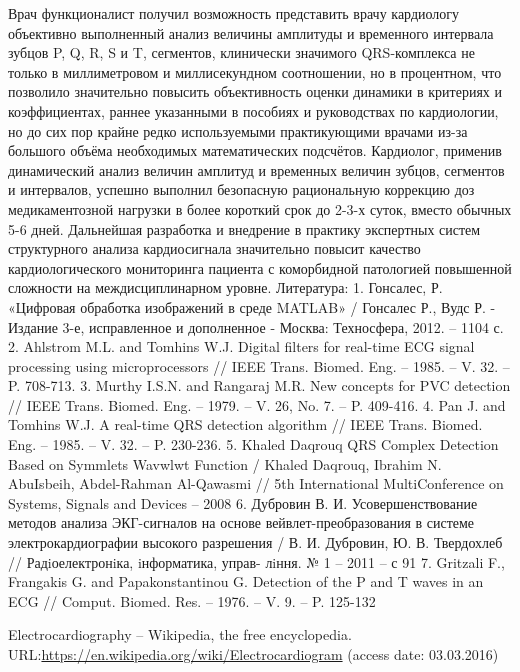 \documentclass[runningheads]{AIIT}
\begin{document}
Врач функционалист получил возможность представить врачу кардиологу объективно выполненный анализ величины амплитуды и временного интервала  зубцов P, Q, R, S и T, сегментов, клинически значимого QRS-комплекса не только в миллиметровом и миллисекундном соотношении, но в процентном, что позволило значительно повысить объективность оценки динамики в критериях и коэффициентах, раннее указанными в  пособиях и руководствах по кардиологии, но до сих пор крайне редко используемыми практикующими врачами из-за большого объёма необходимых математических подсчётов.
 Кардиолог, применив динамический анализ величин амплитуд и временных величин зубцов, сегментов и интервалов,  успешно выполнил безопасную рациональную коррекцию доз медикаментозной нагрузки в более короткий срок до 2-3-х суток, вместо обычных 5-6 дней.
Дальнейшая разработка и внедрение в практику экспертных систем структурного анализа кардиосигнала значительно повысит качество кардиологического мониторинга пациента с коморбидной патологией повышенной сложности на междисциплинарном уровне.
Литература:
1.	Гонсалес, Р. «Цифровая обработка изображений в среде MATLAB» / Гонсалес Р., Вудс Р. - Издание 3-е, исправленное и дополненное - Москва: Техносфера, 2012. – 1104 с.
2.	Ahlstrom M.L. and Tomhins W.J. Digital filters for real-time ECG signal processing using microprocessors // IEEE Trans. Biomed. Eng. – 1985. – V. 32. – P. 708-713.
3.	Murthy I.S.N. and Rangaraj M.R. New concepts for PVC detection // IEEE Trans. Biomed. Eng. – 1979. – V. 26, No. 7. – P. 409-416.
4.	Pan J. and Tomhins W.J. A real-time QRS detection algorithm // IEEE Trans. Biomed. Eng. – 1985. – V. 32. – P. 230-236.
5.	Khaled Daqrouq QRS Complex Detection Based on Symmlets Wavwlwt Function / Khaled Daqrouq, Ibrahim N. AbuIsbeih, Abdel-Rahman Al-Qawasmi // 5th International MultiConference on Systems, Signals and Devices – 2008
6.	Дубровин В. И. Усовершенствование методов анализа ЭКГ-сигналов на основе вейвлет-преобразования в системе электрокардиографии высокого разрешения / В. И. Дубровин, Ю. В. Твердохлеб // Радiоелектронiка, iнформатика, управ- лiння. № 1 – 2011 – с 91
7.	Gritzali F., Frangakis G. and Papakonstantinou G. Detection of the P and T waves in an ECG // Comput. Biomed. Res. – 1976. – V. 9. – P. 125-132

%
%
 \begin{thebibliography}{99}
  Electrocardiography -- Wikipedia, the free encyclopedia. URL:\url{https://en.wikipedia.org/wiki/Electrocardiogram} (access date: 03.03.2016)
 \end{thebibliography}


%
%

\end{document}
